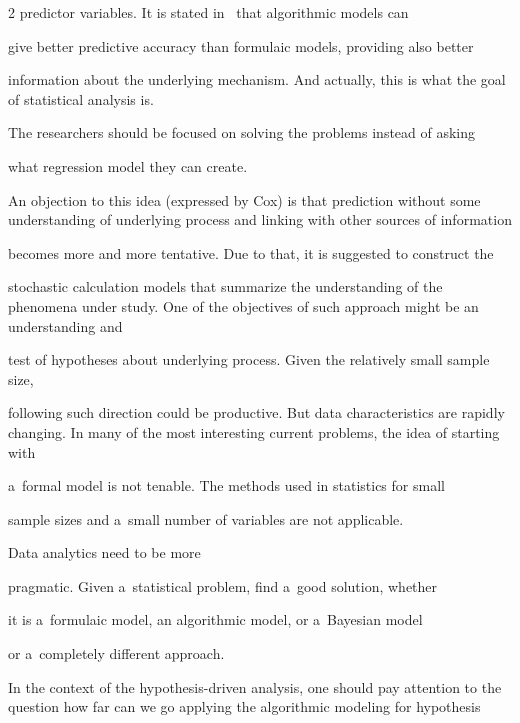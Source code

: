 \begin{multicols}{2}
predictor variables. It is stated in~\cite{36-kl} that algorithmic models can


give better predictive accuracy than formulaic models, providing also better


information about the underlying mechanism. And actually, this is what the goal of statistical analysis is.


The researchers should be focused on solving the problems instead of asking


what regression model they can create.





  An objection to this idea (expressed by Cox) is that prediction without some understanding of underlying process and linking with other sources of information


becomes more and more tentative. Due to that, it is suggested to construct the


stochastic calculation models that summarize the understanding of the phenomena under study. One of the objectives of such approach might be an understanding and


test of hypotheses about underlying process. Given the relatively small sample size,


following such direction could be productive. But data characteristics are rapidly changing. In many of the most interesting current problems, the idea of starting with


a~formal model is not tenable. The methods used in statistics for small


sample sizes and a~small number of variables are not applicable.


Data analytics need to be more


pragmatic. Given a~statistical problem, find a~good solution, whether


it is a~formulaic model, an algorithmic model, or a~Bayesian model


 or a~completely different approach.


 {





 }





  In the context of the hypothesis-driven analysis, one should pay attention to the question how far can we go applying the algorithmic modeling for hypothesis



\end{multicols}
